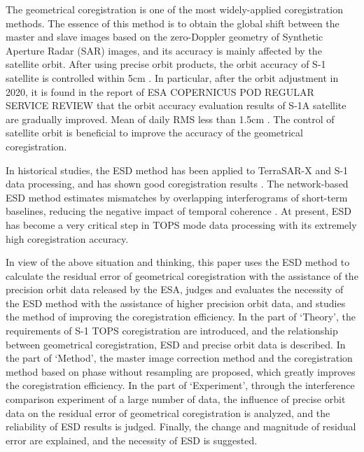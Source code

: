 \documentclass[preprint, authoryear]{elsarticle}
\begin{document}
The geometrical coregistration is one of the most widely-applied coregistration methods. The essence of this method is to obtain the global shift between the master and slave images based on the zero-Doppler geometry of Synthetic Aperture Radar (SAR) images, and its accuracy is mainly affected by the satellite orbit. After using precise orbit products, the orbit accuracy of S-1 satellite is controlled within 5cm \cite{Interferometric_Processing_of_Sentinel-1_TOPS_Data, A_Study_of_Sentinel-1_TOPS_Mode_Co-registration}. In particular, after the orbit adjustment in 2020, it is found in the report of ESA COPERNICUS POD REGULAR SERVICE REVIEW that the orbit accuracy evaluation results of S-1A satellite are gradually improved. Mean of daily RMS less than 1.5cm \cite{copernicus_review_2020.10-2020.12, copernicus_review_2021.01-2021.12, copernicus_review_2022.01-2022.12}. The control of satellite orbit is beneficial to improve the accuracy of the geometrical coregistration. \par

In historical studies, the ESD method has been applied to TerraSAR-X and S-1 data processing, and has shown good coregistration results \cite{Interferometry_with_TOPS:_coregistration_and_azimuth_shifts, Interferometric_Processing_of_Sentinel-1_TOPS_Data}. The network-based ESD method estimates mismatches by overlapping interferograms of short-term baselines, reducing the negative impact of temporal coherence \cite{A_Network-Based_Enhanced_Spectral_Diversity_Approach_for_TOPS_Time-Series_Analysis}. At present, ESD has become a very critical step in TOPS mode data processing with its extremely high coregistration accuracy.

In view of the above situation and thinking, this paper uses the ESD method to calculate the residual error of geometrical coregistration with the assistance of the precision orbit data released by the ESA, judges and evaluates the necessity of the ESD method with the assistance of higher precision orbit data, and studies the method of improving the coregistration efficiency. In the part of ‘Theory’, the requirements of S-1 TOPS coregistration are introduced, and the relationship between geometrical coregistration, ESD and precise orbit data is described. In the part of ‘Method’, the master image correction method and the coregistration method based on phase without resampling are proposed, which greatly improves the coregistration efficiency. In the part of ‘Experiment’, through the interference comparison experiment of a large number of data, the influence of precise orbit data on the residual error of geometrical coregistration is analyzed, and the reliability of ESD results is judged. Finally, the change and magnitude of residual error are explained, and the necessity of ESD is suggested.
\end{document}
